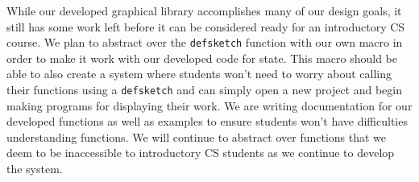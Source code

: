 \documentclass[12pt]{article}
\newcommand{\comment}[1]{{\bf \tt  {#1}}}
\newcommand{\emcomment}[1]{\textcolor{ForestGreen}{\comment{Elena: {#1}}}}
\begin{document}
While our developed graphical library accomplishes many of our design goals, it still has some work left before it can be considered ready for an introductory CS course. We plan to abstract over the \texttt{defsketch} function with our own macro in order to make it work with our developed code for state. This macro should be able to also create a system where students won't need to worry about calling their functions using a \texttt{defsketch} and can simply open a new project and begin making programs for displaying their work. We are writing documentation for our developed functions as well as examples to ensure students won't have difficulties understanding functions. We will continue to abstract over functions that we deem to be inaccessible to introductory CS students as we continue to develop the system. %


%
%

%  
%
%




\end{document}
